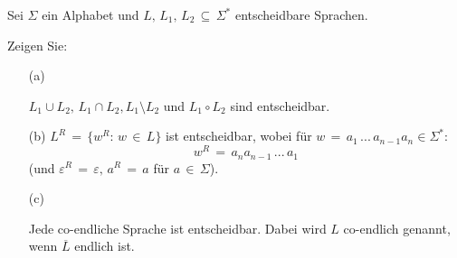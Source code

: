 \begin{exercise}

Sei $\Sigma$ ein Alphabet und $L, \, L_1, \, L_2 \, \subseteq \, \Sigma^*$ entscheidbare Sprachen.

Zeigen Sie:
\begin{enumerate}
\item [(a)]

$L_1 \cup L_2, \, L_1 \cap L_2, L_1 \setminus L_2$ und $L_1 \circ L_2$ sind entscheidbar.

\item [(b)]
$L^R \, = \, \{w^R :\, w \, \in \, L\}$ ist entscheidbar,
 wobei f\"ur $w \, = \, a_1\, ... \, a_{n-1} a_n \in \Sigma^*$:
 \[
  w^R \, = \, a_n a_{n-1}\, ... \, a_1
 \]
 (und $\varepsilon^R \, = \, \varepsilon, \, a^R \, = \, a$ f\"ur $a \, \in \, \Sigma$).

\item [(c)]

Jede co-endliche Sprache ist entscheidbar.
Dabei wird $L$ co-endlich genannt, wenn $\overline{L}$ endlich ist.

\end{enumerate}

\end{exercise}

